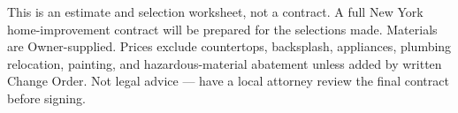 \documentclass[11pt]{article}
\begin{document}
\vspace{8pt}
{\scriptsize\color{slate}\RaggedRight This is an estimate and selection worksheet, not a contract. A full New York home-improvement contract will be prepared for the selections made. Materials are Owner-supplied. Prices exclude countertops, backsplash, appliances, plumbing relocation, painting, and hazardous-material abatement unless added by written Change Order. Not legal advice — have a local attorney review the final contract before signing.\par}

\label{LastPage}
\end{document}
